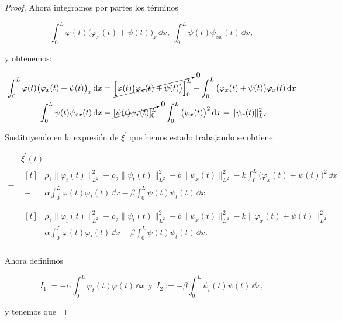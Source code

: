 \begin{proof}
    Ahora integramos por partes los términos

    \[\int_0^L\varphi(t)\big(\varphi_x(t) + \psi(t)\big)_x \, \dd x, \ \int_0^L\psi(t)\psi_{xx}(t) \, \dd x,\]

    y obtenemos:

    \begin{align*}
        \int_0^L\varphi(t)\big(\varphi_x(t) + \psi(t)\big)_x \, \mathrm{d} x &= \cancelto{0}{\Big[\varphi(t)\big(\varphi_x(t) + \psi(t)\big)\Big]_0^L} - \int_0^L\big(\varphi_x(t) + \psi(t)\big)\varphi_x(t) \, \mathrm{d} x\\
        \int_0^L\psi(t)\psi_{xx}(t) \, \mathrm{d} x &= \cancelto{0}{[\psi(t)\psi_x(t)]_0^L} - \int_0^L \big(\psi_x(t)\big)^2 \, \mathrm{d} x = \lVert \psi_x(t) \rVert_{L^2}^2.
    \end{align*}

    Sustituyendo en la expresión de $\xi^\prime$ que hemos estado trabajando se obtiene:

    \begin{align}
        \label{funcionalXiDerivada}
        &\xi^\prime(t)\\
        =&\begin{aligned}[t]
            &\rho_1\lVert \varphi_t(t)\rVert^2_{L^2} + \rho_2\lVert \psi_t(t)\rVert^2_{L^2} -b\lVert \psi_x(t) \rVert_{L^2}^2 -k\int_0^L\big(\varphi_x(t) + \psi(t)\big)^2 \, \dd x\\
            -&\alpha\int_0^L\varphi(t)\varphi_t(t) \, \dd x - \beta\int_0^L\psi(t)\psi_t(t)\, \dd x\\
        \end{aligned}\\      
        =&\begin{aligned}[t]
            &\rho_1\lVert \varphi_t(t)\rVert^2_{L^2} + \rho_2\lVert \psi_t(t)\rVert^2_{L^2} -b\lVert \psi_x(t) \rVert_{L^2}^2 -k\lVert\varphi_x(t) + \psi(t)\rVert^2_{L^2}\\
        -&\alpha\int_0^L\varphi(t)\varphi_t(t) \, \dd x - \beta\int_0^L\psi(t)\psi_t(t)\, \dd x.\\
        \end{aligned}
    \end{align}

    Ahora definimos

    \[I_1 := -\alpha\int_0^L\varphi_t(t)\varphi(t) \, \dd x \ \ \text{y} \ \ I_2 := -\beta\int_0^L\psi_t(t)\psi(t) \, \dd x,\]

    y tenemos que


\end{proof}
